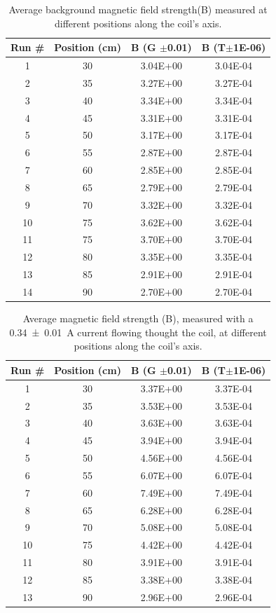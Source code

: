\begin{table}[H]
\centering
\begin{tabular}{|c|c|c|c|}
\hline
Run \# & Position (cm) & B (G $\pm$0.01) & B (T$\pm$1E-06) \\ \hline
1 & 30 & 3.04E+00 & 3.04E-04 \\
2 & 35 & 3.27E+00 & 3.27E-04 \\
3 & 40 & 3.34E+00 & 3.34E-04 \\
4 & 45 & 3.31E+00 & 3.31E-04 \\
5 & 50 & 3.17E+00 & 3.17E-04 \\
6 & 55 & 2.87E+00 & 2.87E-04 \\
7 & 60 & 2.85E+00 & 2.85E-04 \\
8 & 65 & 2.79E+00 & 2.79E-04 \\
9 & 70 & 3.32E+00 & 3.32E-04 \\
10 & 75 & 3.62E+00 & 3.62E-04 \\
11 & 75 & 3.70E+00 & 3.70E-04 \\
12 & 80 & 3.35E+00 & 3.35E-04 \\
13 & 85 & 2.91E+00 & 2.91E-04 \\
14 & 90 & 2.70E+00 & 2.70E-04 \\ \hline
\end{tabular}
\caption{Average background magnetic field strength(B) measured at different positions along the coil's axis.}
\end{table}

\begin{table}[H]
\centering
\begin{tabular}{|c|c|c|c|}
\hline
Run \# & Position (cm) & B (G $\pm$0.01) & B (T$\pm$1E-06) \\ \hline
1 & 30 & 3.37E+00 & 3.37E-04 \\
2 & 35 & 3.53E+00 & 3.53E-04 \\
3 & 40 & 3.63E+00 & 3.63E-04 \\
4 & 45 & 3.94E+00 & 3.94E-04 \\
5 & 50 & 4.56E+00 & 4.56E-04 \\
6 & 55 & 6.07E+00 & 6.07E-04 \\
7 & 60 & 7.49E+00 & 7.49E-04 \\
8 & 65 & 6.28E+00 & 6.28E-04 \\
9 & 70 & 5.08E+00 & 5.08E-04 \\
10 & 75 & 4.42E+00 & 4.42E-04 \\
11 & 80 & 3.91E+00 & 3.91E-04 \\
12 & 85 & 3.38E+00 & 3.38E-04 \\
13 & 90 & 2.96E+00 & 2.96E-04 \\ \hline
\end{tabular}
\caption{Average magnetic field strength (B), measured with a \SI{0.34 \pm 0.01}{\ampere} current flowing thought the coil, at different positions along the coil's axis.}
\end{table}


